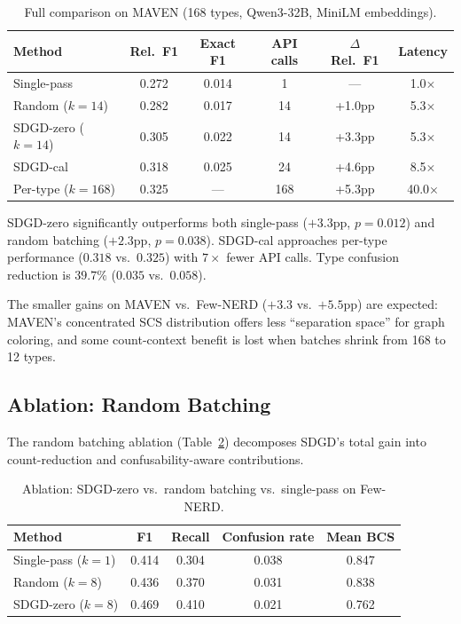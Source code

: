 \documentclass[11pt,a4paper]{article}
\begin{document}
\begin{table}[t]
\centering
\small
\caption{Full comparison on MAVEN (168 types, Qwen3-32B, MiniLM embeddings).}
\label{tab:maven-full}
\begin{tabular}{lccccc}
\toprule
Method & Rel.\ F1 & Exact F1 & API calls & $\Delta$ Rel.\ F1 & Latency \\
\midrule
Single-pass         & 0.272 & 0.014 & 1   & ---     & 1.0$\times$ \\
Random ($k{=}14$)   & 0.282 & 0.017 & 14  & +1.0pp  & 5.3$\times$ \\
SDGD-zero ($k{=}14$)& 0.305 & 0.022 & 14  & +3.3pp  & 5.3$\times$ \\
SDGD-cal            & 0.318 & 0.025 & 24  & +4.6pp  & 8.5$\times$ \\
Per-type ($k{=}168$) & 0.325 & ---   & 168 & +5.3pp  & 40.0$\times$ \\
\bottomrule
\end{tabular}
\end{table}

SDGD-zero significantly outperforms both single-pass ($+3.3$pp, $p{=}0.012$) and random batching ($+2.3$pp, $p{=}0.038$).
SDGD-cal approaches per-type performance ($0.318$ vs.\ $0.325$) with $7\times$ fewer API calls.
Type confusion reduction is $39.7\%$ ($0.035$ vs.\ $0.058$).

The smaller gains on MAVEN vs.\ Few-NERD ($+3.3$ vs.\ $+5.5$pp) are expected: MAVEN's concentrated SCS distribution offers less ``separation space'' for graph coloring, and some count-context benefit is lost when batches shrink from 168 to 12 types.


\subsection{Ablation: Random Batching}
\label{sec:ablation-random}

The random batching ablation (Table~\ref{tab:ablation}) decomposes SDGD's total gain into count-reduction and confusability-aware contributions.

\begin{table}[t]
\centering
\small
\caption{Ablation: SDGD-zero vs.\ random batching vs.\ single-pass on Few-NERD.}
\label{tab:ablation}
\begin{tabular}{lcccc}
\toprule
Method & F1 & Recall & Confusion rate & Mean BCS \\
\midrule
Single-pass ($k{=}1$) & 0.414 & 0.304 & 0.038 & 0.847 \\
Random ($k{=}8$)      & 0.436 & 0.370 & 0.031 & 0.838 \\
SDGD-zero ($k{=}8$)   & 0.469 & 0.410 & 0.021 & 0.762 \\
\bottomrule
\end{tabular}
\end{table}
\end{document}
